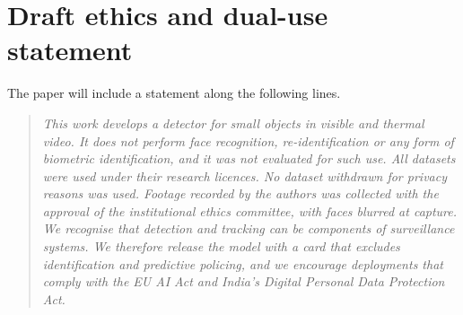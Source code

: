\section{Draft ethics and dual-use statement}

The paper will include a statement along the following lines.

\begin{quote}
\itshape
This work develops a detector for small objects in visible and thermal video.
It does not perform face recognition, re-identification or any form of
biometric identification, and it was not evaluated for such use. All
datasets were used under their research licences. No dataset withdrawn for
privacy reasons was used. Footage recorded by the authors was collected with
the approval of the institutional ethics committee, with faces blurred at
capture. We recognise that detection and tracking can be components of
surveillance systems. We therefore release the model with a card that
excludes identification and predictive policing, and we encourage
deployments that comply with the EU AI Act and India's Digital Personal Data
Protection Act.
\end{quote}
